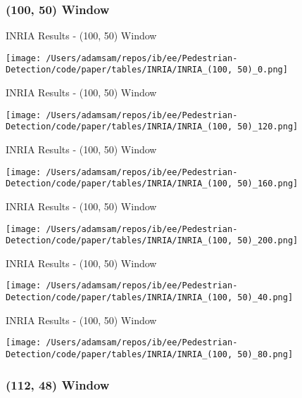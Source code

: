 
\subsubsection*{(100, 50) Window}

\begin{table}
    \caption{INRIA Results - (100, 50) Window}
    \texttt{[image: /Users/adamsam/repos/ib/ee/Pedestrian-Detection/code/paper/tables/INRIA/INRIA\_(100, 50)\_0.png]}
    \label{tab:INRIA_(100, 50)_0}
\end{table}

\begin{table}
    \caption{INRIA Results - (100, 50) Window}
    \texttt{[image: /Users/adamsam/repos/ib/ee/Pedestrian-Detection/code/paper/tables/INRIA/INRIA\_(100, 50)\_120.png]}
    \label{tab:INRIA_(100, 50)_120}
\end{table}

\begin{table}
    \caption{INRIA Results - (100, 50) Window}
    \texttt{[image: /Users/adamsam/repos/ib/ee/Pedestrian-Detection/code/paper/tables/INRIA/INRIA\_(100, 50)\_160.png]}
    \label{tab:INRIA_(100, 50)_160}
\end{table}

\begin{table}
    \caption{INRIA Results - (100, 50) Window}
    \texttt{[image: /Users/adamsam/repos/ib/ee/Pedestrian-Detection/code/paper/tables/INRIA/INRIA\_(100, 50)\_200.png]}
    \label{tab:INRIA_(100, 50)_200}
\end{table}

\begin{table}
    \caption{INRIA Results - (100, 50) Window}
    \texttt{[image: /Users/adamsam/repos/ib/ee/Pedestrian-Detection/code/paper/tables/INRIA/INRIA\_(100, 50)\_40.png]}
    \label{tab:INRIA_(100, 50)_40}
\end{table}

\begin{table}
    \caption{INRIA Results - (100, 50) Window}
    \texttt{[image: /Users/adamsam/repos/ib/ee/Pedestrian-Detection/code/paper/tables/INRIA/INRIA\_(100, 50)\_80.png]}
    \label{tab:INRIA_(100, 50)_80}
\end{table}

\subsubsection*{(112, 48) Window}

